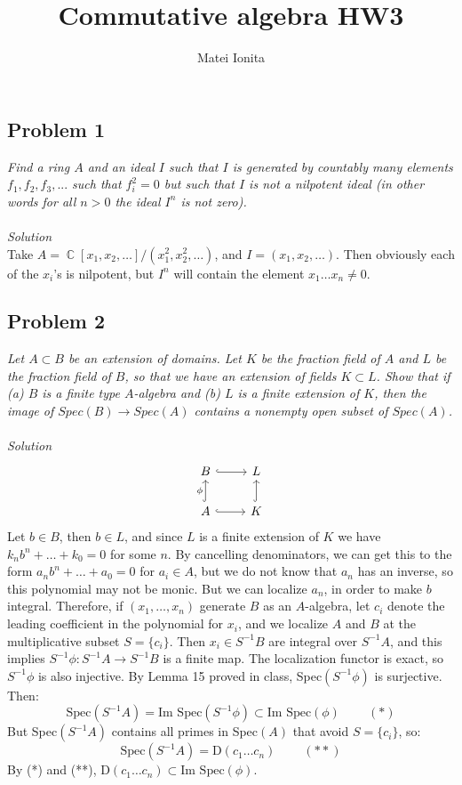 \documentclass[12 pt]{article}
\title{Commutative algebra HW3}
\author{Matei Ionita}
\DeclareMathOperator {\C} {\mathbb{C}}
\begin{document}
  \maketitle

\subsection*{Problem 1}
\emph{Find a ring $A$ and an ideal $I$ such that $I$ is generated by countably many elements $f_1, f_2, f_3, ...$ such that $f_i^2 = 0$ but such that $I$ is not a nilpotent ideal (in other words for all $n > 0$ the ideal $I^n$ is not zero).}
\\
\\
\emph{Solution}
\\
Take $A = \C[x_1, x_2, \dots]/(x_1^2, x_2^2, \dots)$, and $I = (x_1, x_2, \dots)$. Then obviously each of the $x_i$'s is nilpotent, but $I^n$ will contain the element $x_1 \dots x_n \neq 0$.

\subsection*{Problem 2}
\emph{Let $A \subset B$ be an extension of domains. Let $K$ be the fraction field of $A$ and $L$ be the fraction field of $B$, so that we have an extension of fields $K \subset L$. Show that if (a) $B$ is a finite type $A$-algebra and (b) $L$ is a finite extension of $K$, then the image of $Spec(B) \to Spec(A)$ contains a nonempty open subset of $Spec(A)$.}
\\
\\
\emph{Solution}
\[
\begin{tikzcd}
B\arrow[hook]{r} & L \\
A\arrow[hook]{u}{\phi}\arrow[hook]{r} & K\arrow[hook]{u}
\end{tikzcd}
\]
Let $b \in B$, then $b\in L$, and since $L$ is a finite extension of $K$ we have $k_n b^n + \dots + k_0 = 0 $ for some $n$. By cancelling denominators, we can get this to the form $a_n b^n + \dots + a_0 = 0$ for $a_i \in A$, but we do not know that $a_n$ has an inverse, so this polynomial may not be monic. But we can localize $a_n$, in order to make $b$ integral. Therefore, if $(x_1, \dots, x_n)$ generate $B$ as an $A$-algebra, let $c_i$ denote the leading coefficient in the polynomial for $x_i$, and we localize $A$ and $B$ at the multiplicative subset $S = \{c_i\}$. Then $x_i \in S^{-1}B$ are integral over $S^{-1}A$, and this implies $S^{-1}\phi : S^{-1}A \to S^{-1}B$ is a finite map. The localization functor is exact, so $S^{-1}\phi$ is also injective. By Lemma 15 proved in class, Spec$(S^{-1}\phi)$ is surjective. Then:
\[    \text{Spec}(S^{-1}A) = \text{Im Spec}(S^{-1}\phi) \subset \text{Im } \text{Spec}(\phi) \;\;\;\;\;\;\;\; (*) \]
But Spec$(S^{-1}A)$ contains all primes in Spec$(A)$ that avoid $S = \{c_i\}$, so:
\[       \text{Spec}(S^{-1}A) = \text{D}(c_1 \dots c_n)   \;\;\;\;\;\;\;\; (**)   \]
By (*) and (**), $\text{D}(c_1 \dots c_n) \subset  \text{Im } \text{Spec}(\phi)$.
\end{document}
